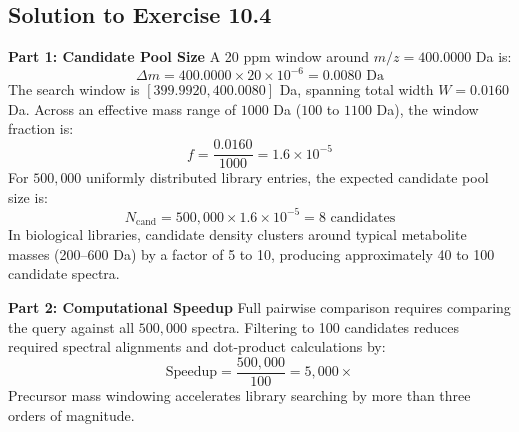 \documentclass[11pt,twoside,openright]{book}
\begin{document}
\subsection{Solution to Exercise 10.4}

\noindent\textbf{Part 1: Candidate Pool Size}\enspace
A 20 ppm window around $m/z = 400.0000$ Da is:
\begin{equation*}
\Delta m = 400.0000 \times 20 \times 10^{-6} = 0.0080 \text{ Da}
\end{equation*}
The search window is $[399.9920, 400.0080]$ Da, spanning total width $W = 0.0160$ Da.
Across an effective mass range of $1000$ Da ($100$ to $1100$ Da), the window fraction is:
\begin{equation*}
f = \frac{0.0160}{1000} = 1.6 \times 10^{-5}
\end{equation*}
For $500,000$ uniformly distributed library entries, the expected candidate pool size is:
\begin{equation*}
N_{\text{cand}} = 500,000 \times 1.6 \times 10^{-5} = 8 \text{ candidates}
\end{equation*}
In biological libraries, candidate density clusters around typical metabolite masses (200--600 Da) by a factor of 5 to 10, producing approximately 40 to 100 candidate spectra.

\noindent\textbf{Part 2: Computational Speedup}\enspace
Full pairwise comparison requires comparing the query against all $500,000$ spectra. Filtering to 100 candidates reduces required spectral alignments and dot-product calculations by:
\begin{equation*}
\text{Speedup} = \frac{500,000}{100} = 5,000\times
\end{equation*}
Precursor mass windowing accelerates library searching by more than three orders of magnitude.

\end{document}
